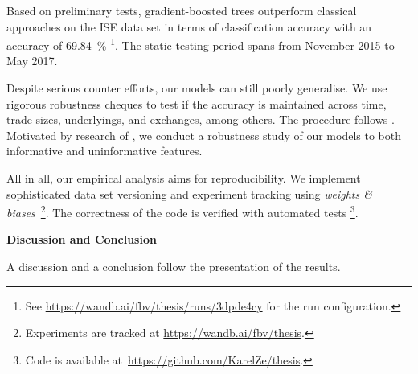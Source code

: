 Based on preliminary tests, gradient-boosted trees outperform classical approaches on the \gls{ISE} data set in terms of classification accuracy with an accuracy of 69.84~\% \footnote{See \url{https://wandb.ai/fbv/thesis/runs/3dpde4cy} for the run configuration.}. The static testing period spans from November 2015 to May 2017.


Despite serious counter efforts, our models can still poorly generalise. We use rigorous robustness cheques to test if the accuracy is maintained across time, trade sizes, underlyings, and exchanges, among others. The procedure follows \textcites{chakrabartyTradeClassificationAlgorithms2012}{grauerOptionTradeClassification2022}{ronenMachineLearningTrade2022}{savickasInferringDirectionOption2003}. Motivated by research of \textcite{grinsztajnWhyTreebasedModels2022}, we conduct a robustness study of our models to both informative and uninformative features.

All in all, our empirical analysis aims for reproducibility. We implement sophisticated data set versioning and experiment tracking using \textit{weights \& biases}~\footnote{Experiments are tracked at \url{https://wandb.ai/fbv/thesis}.}. The correctness of the code is verified with automated tests \footnote{Code is available at~\url{https://github.com/KarelZe/thesis}.}. 

\textbf{Discussion and Conclusion}

A discussion and a conclusion follow the presentation of the results.


